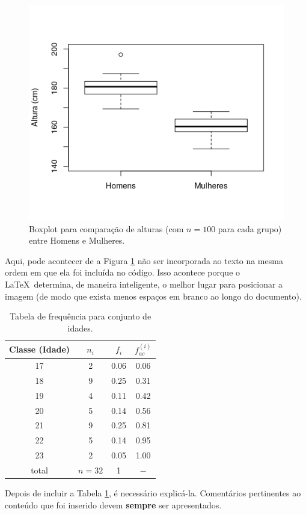 \documentclass[12pt]{article}
\begin{document}
	\begin{figure}
		\centering
		\includegraphics[width=.60\linewidth]{Boxplot}
		\vspace{-36pt}
		\caption{\small Boxplot para comparação de alturas (com $n = 100$ para cada grupo) entre Homens e Mulheres.}
		\label{fig:histograma}
	\end{figure}
	
	\par Aqui, pode acontecer de a Figura \ref{fig:histograma} não ser incorporada ao texto na mesma ordem em que ela foi incluída no código. Isso acontece porque o \LaTeX~determina, de maneira inteligente, o melhor lugar para posicionar a imagem (de modo que exista menos espaços em branco ao longo do documento).
	
	\begin{table}[h]
		\centering
		\begin{tabular}{c|c|c|c}
			\hline
			Classe (Idade) & $n_i$ & $f_i$ & $f_{ac}^{(i)}$ \\
			\hline \hline
			17 & 2 & 0.06 & 0.06 \\
			18 & 9 & 0.25 & 0.31 \\
			19 & 4 & 0.11 & 0.42 \\
			20 & 5 & 0.14 & 0.56 \\
			21 & 9 & 0.25 & 0.81 \\
			22 & 5 & 0.14 & 0.95 \\
			23 & 2 & 0.05 & 1.00 \\
			\hline \hline
			total & $n = 32$ & 1 & $-$ \\
			\hline
		\end{tabular}
		\caption{Tabela de frequência para conjunto de idades.}
		\label{tb:frequencia}
	\end{table}

	\par Depois de incluir a Tabela \ref{tb:frequencia}, é necessário explicá-la. Comentários pertinentes ao conteúdo que foi inserido devem \textbf{sempre} ser apresentados.
	
\end{document}

